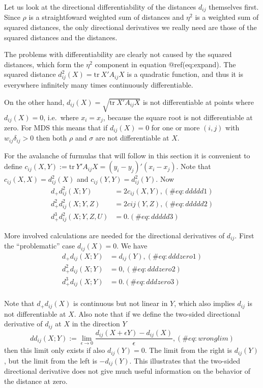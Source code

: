 \documentclass[
  12pt,
  letterpaper,
  DIV=11,
  numbers=noendperiod]{scrreprt}
\theoremstyle{remark}
\begin{document}
Let us look at the directional differentiability of the distances
\(d_{ij}\) themselves first. Since \(\rho\) is a straightfoward weighted
sum of distances and \(\eta^2\) is a weighted sum of squared distances,
the only directional derivatives we really need are those of the squared
distances and the distances.

The problems with differentiability are clearly not caused by the
squared distances, which form the \(\eta^2\) component in equation
@ref(eq:expand). The squared distance
\(d_{ij}^2(X)=\text{tr}\ X'A_{ij}X\) is a quadratic function, and thus
it is everywhere infinitely many times continuously differentiable.

On the other hand, \(d_{ij}(X)=\sqrt{\text{tr}\ X'A_{ij}X}\) is not
differentiable at points where \(d_{ij}(X)=0\), i.e.~where \(x_i=x_j\),
because the square root is not differentiable at zero. For MDS this
means that if \(d_{ij}(X)=0\) for one or more \((i,j)\) with
\(w_{ij}\delta_{ij}>0\) then both \(\rho\) and \(\sigma\) are not
differentiable at \(X\).

For the avalanche of furmulas that will follow in this section it is
convenient to define
\(c_{ij}(X,Y):=\text{tr}\ Y'A_{ij}X=(y_i-y_j)'(x_i-x_j)\). Note that
\(c_{ij}(X,X)=d_{ij}^2(X)\) and \(c_{ij}(Y,Y)=d_{ij}^2(Y)\). Now
\begin{align}
d_+d_{ij}^2(X;Y)&=2c_{ij}(X,Y),(\#eq:ddddd1)\\
d_+^2d_{ij}^2(X;Y,Z)&=2c{ij}(Y,Z),(\#eq:ddddd2)\\
d_+^3d_{ij}^2(X;Y,Z,U)&=0.(\#eq:ddddd3)
\end{align}

More involved calculations are needed for the directional derivatives of
\(d_{ij}\). First the ``problematic'' case \(d_{ij}(X)=0\). We have
\begin{align}
d_+d_{ij}(X;Y)&=d_{ij}(Y),(\#eq:dddzero1)\\
d_+^2d_{ij}(X;Y)&=0,(\#eq:dddzero2)\\
d_+^3d_{ij}(X;Y)&=0.(\#eq:dddzero3)\\
\end{align}

Note that \(d_+d_{ij}(X)\) is continuous but not linear in \(Y\), which
also implies \(d_{ij}\) is not differentiable at \(X\). Also note that
if we define the two-sided directional derivative of \(d_{ij}\) at \(X\)
in the direction \(Y\) \begin{equation}
dd_{ij}(X;Y):=\lim_{\epsilon\rightarrow 0}\frac{d_{ij}(X+\epsilon Y)-d_{ij}(X)}{\epsilon},
(\#eq:wronglim)
\end{equation} then this limit only exists if also \(d_{ij}(Y)=0\). The
limit from the right is \(d_{ij}(Y)\), but the limit from the left is
\(-d_{ij}(Y)\). This illustrates that the two-sided directional
derivative does not give much useful information on the behavior of the
distance at zero.
\end{document}
